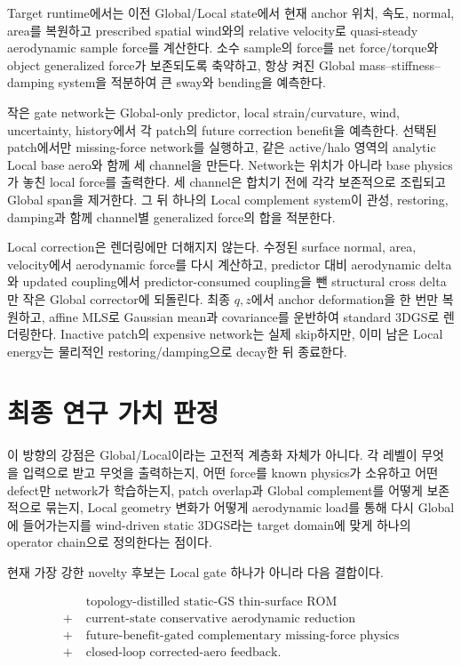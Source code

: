 \documentclass[11pt,a4paper]{article}
\begin{document}
Target runtime에서는 이전 Global/Local state에서 현재 anchor 위치, 속도,
normal, area를 복원하고 prescribed spatial wind와의 relative velocity로
quasi-steady aerodynamic sample force를 계산한다.
소수 sample의 force를 net force/torque와 object generalized force가 보존되도록 축약하고,
항상 켜진 Global mass--stiffness--damping system을 적분하여 큰 sway와 bending을 예측한다.

작은 gate network는 Global-only predictor, local strain/curvature,
wind, uncertainty, history에서 각 patch의 future correction benefit을 예측한다.
선택된 patch에서만 missing-force network를 실행하고,
같은 active/halo 영역의 analytic Local base aero와 함께 세 channel을 만든다.
Network는 위치가 아니라 base physics가 놓친 local force를 출력한다.
세 channel은 합치기 전에 각각 보존적으로 조립되고 Global span을 제거한다.
그 뒤 하나의 Local complement system이 관성, restoring, damping과 함께
channel별 generalized force의 합을 적분한다.

Local correction은 렌더링에만 더해지지 않는다.
수정된 surface normal, area, velocity에서 aerodynamic force를 다시 계산하고,
predictor 대비 aerodynamic delta와
updated coupling에서 predictor-consumed coupling을 뺀 structural cross delta만
작은 Global corrector에 되돌린다.
최종 \(q,z\)에서 anchor deformation을 한 번만 복원하고,
affine MLS로 Gaussian mean과 covariance를 운반하여 standard 3DGS로 렌더링한다.
Inactive patch의 expensive network는 실제 skip하지만,
이미 남은 Local energy는 물리적인 restoring/damping으로 decay한 뒤 종료한다.

\section{최종 연구 가치 판정}

이 방향의 강점은 Global/Local이라는 고전적 계층화 자체가 아니다.
각 레벨이 무엇을 입력으로 받고 무엇을 출력하는지,
어떤 force를 known physics가 소유하고 어떤 defect만 network가 학습하는지,
patch overlap과 Global complement를 어떻게 보존적으로 묶는지,
Local geometry 변화가 어떻게 aerodynamic load를 통해 다시 Global에 들어가는지를
wind-driven static 3DGS라는 target domain에 맞게 하나의 operator chain으로 정의한다는 점이다.

현재 가장 강한 novelty 후보는 Local gate 하나가 아니라 다음 결합이다.

\begin{equation}
\boxed{
\begin{aligned}
&\text{topology-distilled static-GS thin-surface ROM}\\
+\;&\text{current-state conservative aerodynamic reduction}\\
+\;&\text{future-benefit-gated complementary missing-force physics}\\
+\;&\text{closed-loop corrected-aero feedback}.
\end{aligned}
}
\end{equation}
\end{document}

